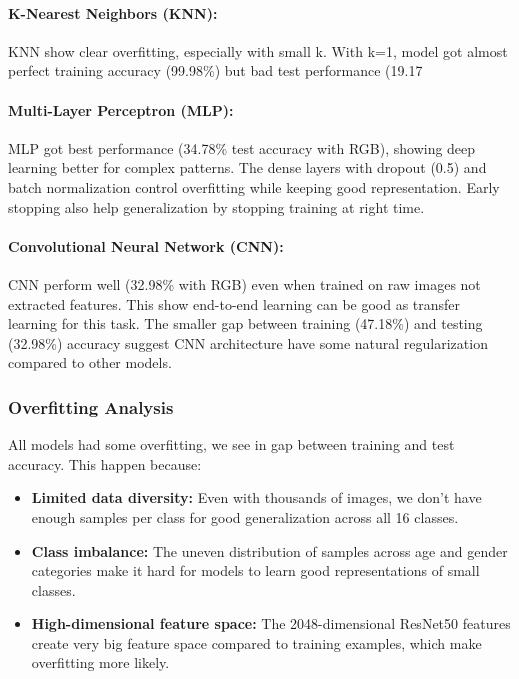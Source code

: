 \documentclass{article}
\begin{document}
\paragraph{K-Nearest Neighbors (KNN):}
KNN show clear overfitting, especially with small k. With k=1, model got almost perfect training accuracy (99.98\%) but bad test performance (19.17%

\paragraph{Multi-Layer Perceptron (MLP):}
MLP got best performance (34.78\% test accuracy with RGB), showing deep learning better for complex patterns. The dense layers with dropout (0.5) and batch normalization control overfitting while keeping good representation. Early stopping also help generalization by stopping training at right time.

\paragraph{Convolutional Neural Network (CNN):}
CNN perform well (32.98\% with RGB) even when trained on raw images not extracted features. This show end-to-end learning can be good as transfer learning for this task. The smaller gap between training (47.18\%) and testing (32.98\%) accuracy suggest CNN architecture have some natural regularization compared to other models.

\subsubsection{Overfitting Analysis}

All models had some overfitting, we see in gap between training and test accuracy. This happen because:

\begin{itemize}
    \item \textbf{Limited data diversity:} Even with thousands of images, we don't have enough samples per class for good generalization across all 16 classes.
    
    \item \textbf{Class imbalance:} The uneven distribution of samples across age and gender categories make it hard for models to learn good representations of small classes.
    
    \item \textbf{High-dimensional feature space:} The 2048-dimensional ResNet50 features create very big feature space compared to training examples, which make overfitting more likely.
\end{itemize}
\end{document}

